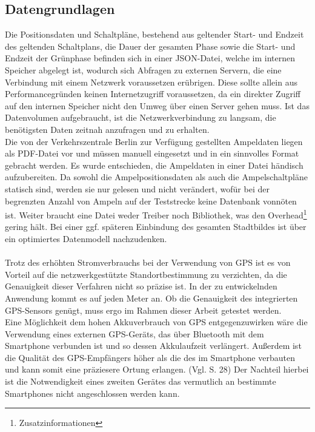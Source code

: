 \subsection{Datengrundlagen}
Die Positionsdaten und Schaltpläne, bestehend aus geltender Start- und Endzeit des geltenden Schaltplans, die Dauer der gesamten Phase sowie die Start- und Endzeit der Grünphase befinden sich in einer \gls{JSON}-Datei, welche im internen Speicher abgelegt ist, wodurch sich Abfragen zu externen Servern, die eine Verbindung mit einem Netzwerk voraussetzen erübrigen. Diese sollte allein aus Performancegründen keinen Internetzugriff voraussetzen, da ein direkter Zugriff auf den internen Speicher nicht den Umweg über einen Server gehen muss. Ist das Datenvolumen aufgebraucht, ist die Netzwerkverbindung zu langsam, die benötigsten Daten zeitnah anzufragen und zu erhalten.\\
Die von der Verkehrszentrale Berlin zur Verfügung gestellten Ampeldaten liegen als \gls{PDF}-Datei vor und müssen manuell eingesetzt und in ein sinnvolles Format gebracht werden. Es wurde entschieden, die Ampeldaten in einer Datei händisch aufzubereiten. Da sowohl die Ampelpositionsdaten als auch die Ampelschaltpläne statisch sind, werden sie nur gelesen und nicht verändert, wofür bei der begrenzten Anzahl von Ampeln auf der Teststrecke keine Datenbank vonnöten ist. Weiter braucht eine Datei weder Treiber noch Bibliothek, was den Overhead\footnote{ Zusatzinformationen} gering hält. 
Bei einer ggf. späteren Einbindung des gesamten Stadtbildes ist über ein optimiertes Datenmodell nachzudenken. \\\\
Trotz des erhöhten Stromverbrauchs bei der Verwendung von \gls{GPS} ist es von Vorteil auf die netzwerkgestützte Standortbestimmung zu verzichten, da die Genauigkeit dieser Verfahren nicht so präzise ist. In der zu entwickelnden Anwendung kommt es auf jeden Meter an. Ob die Genauigkeit des integrierten \gls{GPS}-Sensors genügt, muss ergo im Rahmen dieser Arbeit getestet werden. \\
Eine Möglichkeit dem hohen Akkuverbrauch von \gls{GPS} entgegenzuwirken wäre die Verwendung eines externen \gls{GPS}-Geräts, das über Bluetooth mit dem \gls{Smartphone} verbunden ist und so dessen Akkulaufzeit verlängert. Außerdem ist die Qualität des \gls{GPS}-Empfängers höher als die des im \gls{Smartphone} verbauten und kann somit eine präziesere Ortung erlangen. (Vgl. \cite{gps} S. 28) Der Nachteil hierbei ist die Notwendigkeit eines zweiten Gerätes das vermutlich an bestimmte Smartphones nicht angeschlossen werden kann. 
